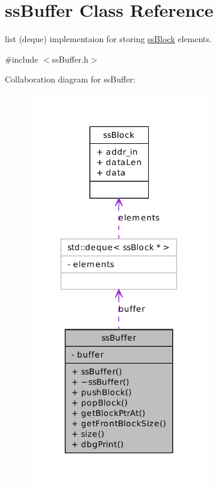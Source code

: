 \hypertarget{classssBuffer}{
\section{ssBuffer Class Reference}
\label{d0/de7/classssBuffer}
}


list (deque) implementaion for storing \hyperlink{structssBlock}{ssBlock} elements.  




{\ttfamily \#include $<$ssBuffer.h$>$}



Collaboration diagram for ssBuffer:\nopagebreak
\begin{figure}[H]
\begin{center}
\leavevmode
\includegraphics[width=224pt]{db/d16/classssBuffer__coll__graph}
\end{center}
\end{figure}
